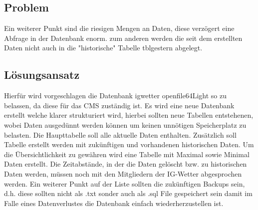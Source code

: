 \subsection*{Problem}
Ein weiterer Punkt sind die riesigen Mengen an Daten, diese verzögert eine Abfrage in der Datenbank enorm. zum anderen werden die seit dem erstellten Daten nicht auch in die "historische" Tabelle tblgestern abgelegt.


\subsection*{Lösungsansatz}
Hierfür wird vorgeschlagen die Datenbank igwetter openfile64Light so zu belassen, da diese für das CMS zuständig ist. Es wird eine neue Datenbank erstellt welche klarer strukturiert wird, hierbei sollten neue Tabellen entstehenen, wobei Daten ausgedünnt werden können um keinen unnötigen Speicherplatz zu belasten. Die Haupttabelle soll alle aktuelle Daten enthalten. Zusätzlich soll Tabelle erstellt werden mit zukünftigen und vorhandenen historischen Daten. Um die Übersichtlichkeit zu gewähren wird eine Tabelle mit Maximal sowie Minimal Daten erstellt. Die Zeitabstände, in der die Daten gelöscht bzw. zu historischen Daten werden, müssen noch mit den Mitgliedern der IG-Wetter abgesprochen werden. Ein weiterer Punkt auf der Liste sollten die zukünftigen Backups sein, d.h. diese sollten nicht als .txt sonder auch als .sql File gespeichert sein damit im Falle eines Datenverlustes die Datenbank einfach wiederherzustellen ist.



